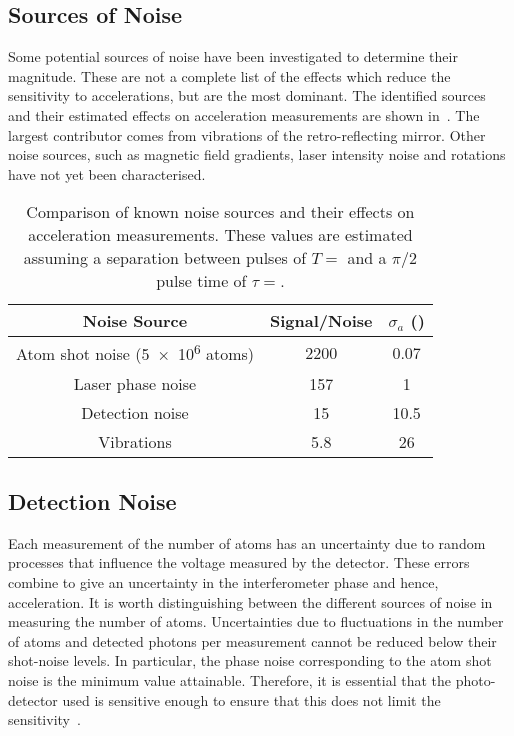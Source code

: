 \subsection{Sources of Noise}\label{subsec:noise_sources}
Some potential sources of noise have been investigated to determine
their magnitude. These are not a complete list of the effects which
reduce the sensitivity to accelerations, but are the most dominant. The
identified sources and their estimated effects on acceleration
measurements are shown in~. The largest
contributor comes from vibrations of the retro-reflecting mirror.
Other noise sources, such as magnetic field gradients, laser intensity
noise and rotations have not yet been characterised.
\begin{table}[htpb!]
  \centering
  \begin{tabular}{c|c|c}
    \toprule
    Noise Source & Signal/Noise & \(\sigma_a\)
    (\sivalue{}{\micro\meter\per\s\squared}) \\
    \midrule
    Atom shot noise (\num{5e6} atoms) & 2200 & 0.07 \\
    Laser phase noise & 157 & 1 \\
    Detection noise & 15 & 10.5 \\
    Vibrations & 5.8 & 26\\
    \bottomrule
  \end{tabular}
  \caption[Comparison of known noise sources.]{Comparison of known noise sources and their effects on
  acceleration measurements. These values are estimated assuming a
separation between pulses of \(T = \) and a \(\pi/2\)
pulse time of \(\tau = \).}
  \label{tab:noise_sources}
\end{table}
\subsection{Detection Noise}\label{subsec:detection_noise}

Each measurement of the number of atoms has an uncertainty due to
random processes that influence the voltage measured by the detector. These errors
combine to give an uncertainty in the interferometer phase and
hence, acceleration. It is worth distinguishing between the different
sources of noise in measuring the number of atoms. Uncertainties due
to fluctuations in the number of atoms and detected photons per
measurement cannot be reduced below their shot-noise levels. In
particular, the phase noise corresponding to the atom shot noise is
the minimum value attainable. Therefore, it is essential that the
photo-detector used is sensitive enough to ensure that this does not
limit the sensitivity~\cite{Rocco2014}.
